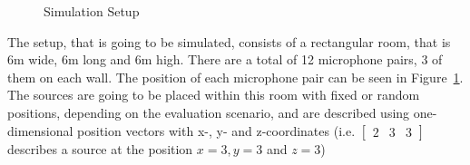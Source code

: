 \begin{figure}[H]
	\centering
	
	\caption{Simulation Setup}
	\label{fig:setup}
\end{figure}

The setup, that is going to be simulated, consists of a rectangular room, that is 6m wide, 6m long and 6m high. There are a total of 12 microphone pairs, 3 of them on each wall. The position of each microphone pair can be seen in Figure~\ref{fig:setup}. The sources are going to be placed within this room with fixed or random positions, depending on the evaluation scenario, and are described using one-dimensional position vectors with x-, y- and z-coordinates (i.e. $\begin{bmatrix} 2&3&3  \end{bmatrix}$ describes a source at the position $x=3, y=3$ and $z=3$)


